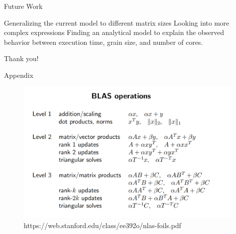 \documentclass[10pt]{beamer}
\begin{document}
\begin{frame}{Future Work}
\begin{outline}	
	\1Generalizing the current model to different matrix sizes
	\1Looking into more complex expressions
	\1Finding an analytical model to explain the observed behavior between execution time, grain size, and number of cores.
	 
%
%
%
\end{outline}
\end{frame}


\begin{frame}[standout]
  Thank you!
\end{frame}

\begin{frame}{Appendix}
	\begin{outline}	
		\begin{figure}[H]
			\includegraphics[scale=.2]{images/BLAS.png}	
			\caption{{https://web.stanford.edu/class/ee392o/nlas-foils.pdf}}
			\label{fig26}		
		\end{figure} 
	\end{outline}
\end{frame}
\end{document}
